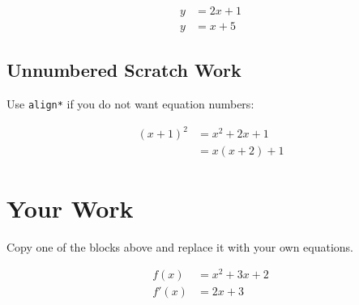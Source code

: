 \documentclass[11pt]{article}
\begin{document}
\begin{align}
y &= 2x + 1 \\
y &= x + 5
\end{align}

\subsection{Unnumbered Scratch Work}
Use \texttt{align*} if you do not want equation numbers:

\begin{align*}
(x+1)^2 &= x^2 + 2x + 1 \\
         &= x(x+2) + 1
\end{align*}

\section{Your Work}
Copy one of the blocks above and replace it with your own equations.

\begin{align}
f(x) &= x^2 + 3x + 2 \\
f'(x) &= 2x + 3
\end{align}
\end{document}
